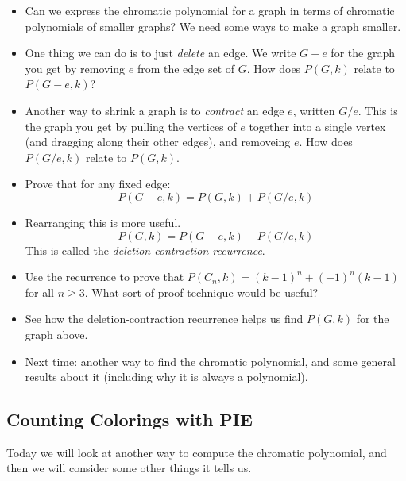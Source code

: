 \documentclass[12pt]{article}
\theoremstyle{plain}
\theoremstyle{definition}
\theoremstyle{remark}
\newcommand{\todayis}[1]{\clearpage{\rhead{\footnotesize #1}}}
\begin{document}
\begin{itemize}
  \item Can we express the chromatic polynomial for a graph in terms of chromatic polynomials of smaller graphs?  We need some ways to make a graph smaller.

  \item One thing we can do is to just \emph{delete} an edge.  We write $G-e$ for the graph you get by removing $e$ from the edge set of $G$.  How does $P(G,k)$ relate to $P(G-e,k)$?

  \item Another way to shrink a graph is to \emph{contract} an edge $e$, written $G/e$.  This is the graph you get by pulling the vertices of $e$ together into a single vertex (and dragging along their other edges), and removeing $e$.  How does $P(G/e,k)$ relate to $P(G,k)$.

  \item Prove that for any fixed edge:
  \[P(G-e,k) = P(G,k)+P(G/e,k)\]

  \item Rearranging this is more useful.
  \[P(G,k) = P(G-e,k) - P(G/e,k)\]
  This is called the \emph{deletion-contraction recurrence}.

  \item Use the recurrence to prove that $P(C_n,k) = (k-1)^n + (-1)^n(k-1)$ for all $n \ge 3$.  What sort of proof technique would be useful?

  \item See how the deletion-contraction recurrence helps us find $P(G,k)$ for the graph above.

  \item Next time: another way to find the chromatic polynomial, and some general results about it (including why it is always a polynomial).
\end{itemize}



\todayis{Wednesday, November 14}

\subsection*{Counting Colorings with PIE}

Today we will look at another way to compute the chromatic polynomial, and then we will consider some other things it tells us.
\end{document}
